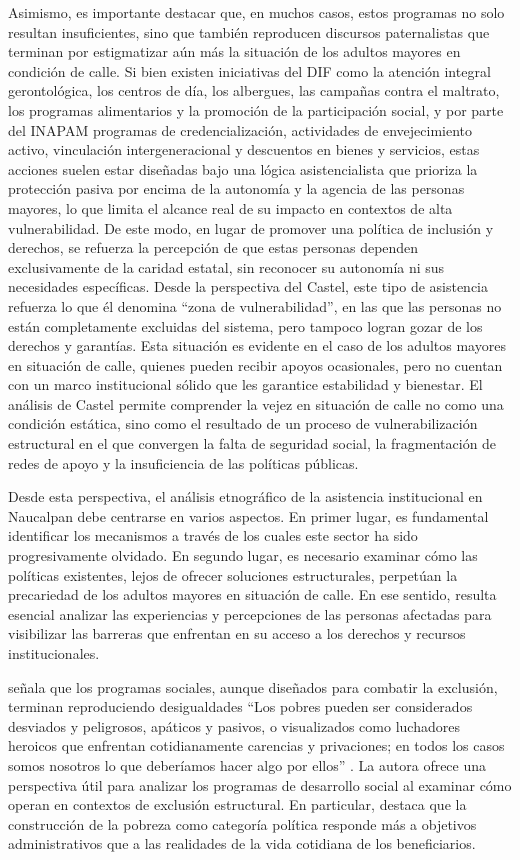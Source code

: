 \documentclass[
  spanish,
  11pt,
  a4paper,
]{scrbook}
\begin{document}
Asimismo, es importante destacar que, en muchos casos, estos programas
no solo resultan insuficientes, sino que también reproducen discursos
paternalistas que terminan por estigmatizar aún más la situación de los
adultos mayores en condición de calle. Si bien existen iniciativas del
DIF como la atención integral gerontológica, los centros de día, los
albergues, las campañas contra el maltrato, los programas alimentarios y
la promoción de la participación social, y por parte del INAPAM
programas de credencialización, actividades de envejecimiento activo,
vinculación intergeneracional y descuentos en bienes y servicios, estas
acciones suelen estar diseñadas bajo una lógica asistencialista que
prioriza la protección pasiva por encima de la autonomía y la agencia de
las personas mayores, lo que limita el alcance real de su impacto en
contextos de alta vulnerabilidad. De este modo, en lugar de promover una
política de inclusión y derechos, se refuerza la percepción de que estas
personas dependen exclusivamente de la caridad estatal, sin reconocer su
autonomía ni sus necesidades específicas. Desde la perspectiva del
Castel, este tipo de asistencia refuerza lo que él denomina ``zona de
vulnerabilidad'', en las que las personas no están completamente
excluidas del sistema, pero tampoco logran gozar de los derechos y
garantías. Esta situación es evidente en el caso de los adultos mayores
en situación de calle, quienes pueden recibir apoyos ocasionales, pero
no cuentan con un marco institucional sólido que les garantice
estabilidad y bienestar. El análisis de Castel permite comprender la
vejez en situación de calle no como una condición estática, sino como el
resultado de un proceso de vulnerabilización estructural en el que
convergen la falta de seguridad social, la fragmentación de redes de
apoyo y la insuficiencia de las políticas públicas.

Desde esta perspectiva, el análisis etnográfico de la asistencia
institucional en Naucalpan debe centrarse en varios aspectos. En primer
lugar, es fundamental identificar los mecanismos a través de los cuales
este sector ha sido progresivamente olvidado. En segundo lugar, es
necesario examinar cómo las políticas existentes, lejos de ofrecer
soluciones estructurales, perpetúan la precariedad de los adultos
mayores en situación de calle. En ese sentido, resulta esencial analizar
las experiencias y percepciones de las personas afectadas para
visibilizar las barreras que enfrentan en su acceso a los derechos y
recursos institucionales.

\textcite{Bayon2014} señala que los programas sociales, aunque diseñados
para combatir la exclusión, terminan reproduciendo desigualdades ``Los
pobres pueden ser considerados desviados y peligrosos, apáticos y
pasivos, o visualizados como luchadores heroicos que enfrentan
cotidianamente carencias y privaciones; en todos los casos somos
nosotros lo que deberíamos hacer algo por ellos''
\autocite[362]{Bayon2014}. La autora ofrece una perspectiva útil para
analizar los programas de desarrollo social al examinar cómo operan en
contextos de exclusión estructural. En particular, destaca que la
construcción de la pobreza como categoría política responde más a
objetivos administrativos que a las realidades de la vida cotidiana de
los beneficiarios.
\end{document}
